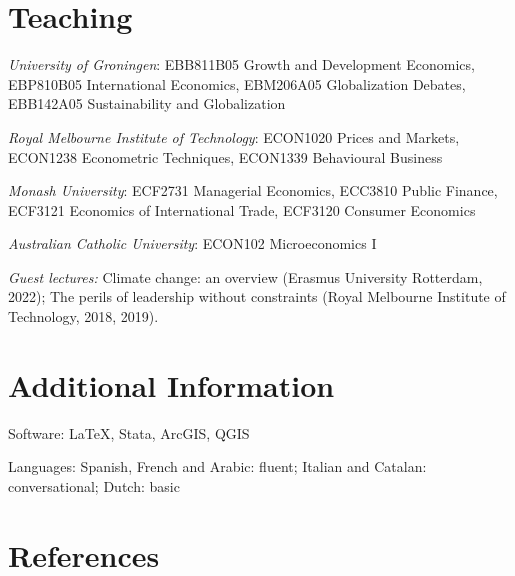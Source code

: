 \documentclass[letterpaper]{article}
\renewenvironment{itemize}{
  \begin{list}{}{
    \setlength{\leftmargin}{1.5em}
  }
}{
  \end{list}
}
\begin{document}
\section*{Teaching}
\begin{itemize}
	
	\item \textit{University of Groningen}: EBB811B05 Growth and Development Economics, EBP810B05 International Economics, EBM206A05 Globalization Debates, EBB142A05 Sustainability and Globalization
	
	\smallskip
	
	\item \textit{Royal Melbourne Institute of Technology}: ECON1020 Prices and Markets, ECON1238 Econometric Techniques, ECON1339 Behavioural Business
	
	
	
	\smallskip
	
	
	
	\item \textit{Monash University}:  ECF2731 Managerial Economics, ECC3810 Public Finance, ECF3121 Economics of International Trade, ECF3120 Consumer Economics
	
	\smallskip
	\item \textit{Australian Catholic University}: ECON102 Microeconomics I
	
		\smallskip
	\item \textit{Guest lectures:} Climate change: an overview (Erasmus University Rotterdam, 2022); The perils of leadership without constraints (Royal Melbourne Institute of Technology, 2018, 2019).
	
	
\end{itemize}





\section*{Additional Information}
\begin{itemize}
\item Software: \LaTeX, Stata, ArcGIS, QGIS
\item Languages: Spanish, French and Arabic: fluent; Italian and Catalan: conversational; Dutch: basic

\end{itemize}



\section*{References}
\end{document}
